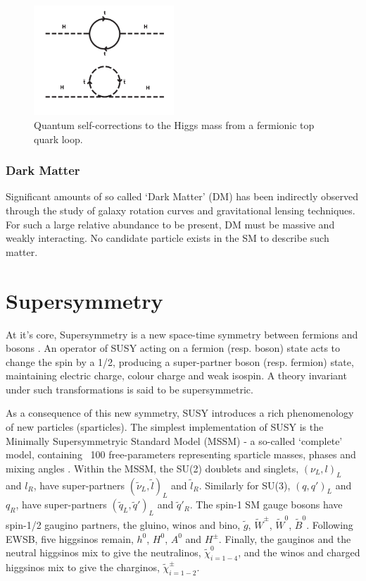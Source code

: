 \begin{figure}[ht!]
\centering
\includegraphics[width=0.47\textwidth,trim=0 250 0 0, clip=true]
{Figs/feynman/600px-Hqmc-vector.png}
\caption{Quantum self-corrections to the Higgs mass from a fermionic top quark
loop.}
\label{fig:quantum_higgs_fermion_loop}
\end{figure}

\subsubsection{Dark Matter}
Significant amounts of so called `Dark Matter' (DM) has been indirectly observed
through the study of galaxy rotation curves and
gravitational lensing techniques\cite{Corbelli15012000,0004-637X-744-2-159}. For
such a large relative abundance to be present, DM must be massive and weakly
interacting. No candidate particle exists in the SM to describe such
matter.

\section{Supersymmetry}  %
\label{sec:theory_overview}
At it's core, Supersymmetry is a new space-time symmetry
between fermions and bosons \cite{ref:SUSY-1,ref:SUSY0,ref:SUSY1,ref:SUSY2,ref:SUSY3,ref:SUSY4}
. An operator of SUSY acting on a fermion 
(resp. boson) state acts to change the spin by a 1/2, producing a super-partner
boson (resp. fermion) state, maintaining electric charge, colour charge and weak
isospin. A theory invariant under such transformations is said to be
supersymmetric.

As a consequence of this new symmetry, SUSY introduces a rich phenomenology of
new particles (sparticles). The simplest implementation of SUSY is the
Minimally
Supersymmetryic Standard Model (MSSM) \cite{Martin:1997ns} - a so-called
`complete' model, containing
~100 free-parameters representing sparticle masses, phases and mixing angles 
\cite{Dimopoulos:1995ju}.
Within the MSSM, the SU(2) doublets and singlets, $(\nu_L, l)_L$ and $l_R$,
have super-partners $(\tilde{\nu}_L, \tilde{l})_L$ and $\tilde{l}_R$. Similarly
for SU(3), $(q, q')_L$ and $q_R$,
have super-partners $(\tilde{q}_L, \tilde{q}')_L$ and $\tilde{q}'_R$. The
spin-1 SM gauge bosons have spin-1/2 gaugino partners, the gluino, winos and
bino, $\tilde{g}$, $\tilde{W}^{\pm}$, $\tilde{W}^0$, $\tilde{B}^0$.
Following EWSB, five higgsinos remain, $h^0$, $H^0$, $A^0$ and
$H^{\pm}$. Finally, the gauginos and the neutral higgsinos mix to give the
neutralinos, $\tilde{\chi}^0_{i=1-4}$, and the winos and charged higgsinos mix
to give the charginos, $\tilde{\chi}^{\pm}_{i=1-2}$.

